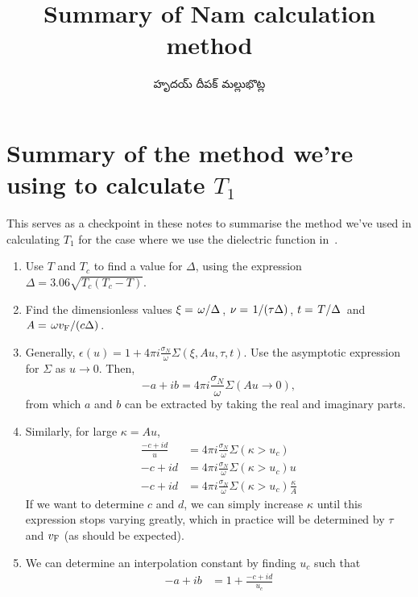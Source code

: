 \documentclass[../main.tex]{subfiles}
\title{Summary of Nam calculation method}
\author{\begin{telugu}హృదయ్ దీపక్ మల్లుభొట్ల\end{telugu}}
\date{}
\begin{document}
	\onlyinsubfile{\maketitle}

	\section{Summary of the method we're using to calculate \texorpdfstring{$T_1$}{T1}} \label{sec:overallsummary:norm}

	This serves as a checkpoint in these notes to summarise the method we've used in calculating $T_{1}$ for the case where we use the dielectric function in~\cite{Nam1967}.

	\begin{enumerate}
		\item Use $T$ and $T_c$ to find a value for $\Delta$, using the expression $\Delta = 3.06 \sqrt{T_c(T_c - T)}$.
		\item Find the dimensionless values $\xi = \flatfrac{\omega}{\Delta}$, $\nu = \flatfrac{1}{(\tau \Delta)}$,  $t = \flatfrac{T}{\Delta}$ and $A = \flatfrac{\omega \vf}{(c \Delta)}$.
		\item Generally, $\epsilon(u) = 1 + 4 \pi i \frac{\sigma_N}{\omega} \Sigma(\xi, A u, \tau, t)$.
		Use the asymptotic expression for $\Sigma$ as $u \rightarrow 0$.
		Then,
		\begin{equation}
			-a + ib = 4 \pi i \frac{\sigma_N}{\omega} \Sigma(A u \rightarrow 0),
		\end{equation}
		from which $a$ and $b$ can be extracted by taking the real and imaginary parts.
		\item Similarly, for large $\kappa = A u$,
		\begin{align}
			\frac{-c + i d}{u} &= 4 \pi i \frac{\sigma_N}{\omega} \Sigma(\kappa > u_c) \\
			- c + i d &= 4 \pi i \frac{\sigma_N}{\omega} \Sigma(\kappa > u_c) u \\
			- c + i d &= 4 \pi i \frac{\sigma_N}{\omega} \Sigma(\kappa > u_c) \frac{\kappa}{A}
		\end{align}
		If we want to determine $c$ and $d$, we can simply increase $\kappa$ until this expression stops varying greatly, which in practice will be determined by $\tau$ and $v_{\mathrm{F}}$ (as should be expected).
		\item We can determine an interpolation constant by finding $u_c$ such that
		\begin{align}
			-a + ib &= 1 + \frac{-c + id}{u_c} \\

\end{align}
\end{enumerate}
\end{document}

